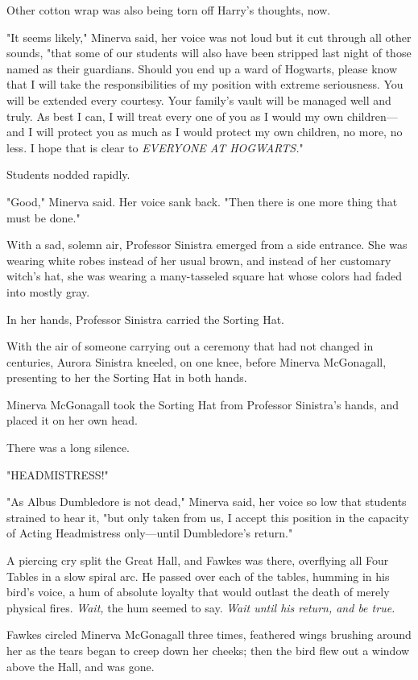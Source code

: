 Other cotton wrap was also being torn off Harry's thoughts, now.

"It seems likely," Minerva said, her voice was not loud but it cut through all
other sounds, "that some of our students will also have been stripped last
night of those named as their guardians. Should you end up a ward of Hogwarts,
please know that I will take the responsibilities of my position with extreme
seriousness. You will be extended every courtesy. Your family's vault will be
managed well and truly. As best I can, I will treat every one of you as I would
my own children---and I will protect you as much as I would protect my own
children, no more, no less. I hope that is clear to \emph{EVERYONE AT
HOGWARTS.}"

Students nodded rapidly.

"Good," Minerva said. Her voice sank back. "Then there is one more thing that
must be done."

With a sad, solemn air, Professor Sinistra emerged from a side entrance. She
was wearing white robes instead of her usual brown, and instead of her
customary witch's hat, she was wearing a many-tasseled square hat whose colors
had faded into mostly gray.

In her hands, Professor Sinistra carried the Sorting Hat.

With the air of someone carrying out a ceremony that had not changed in
centuries, Aurora Sinistra kneeled, on one knee, before Minerva McGonagall,
presenting to her the Sorting Hat in both hands.

Minerva McGonagall took the Sorting Hat from Professor Sinistra's hands, and
placed it on her own head.

There was a long silence.

"HEADMISTRESS!"

"As Albus Dumbledore is not dead," Minerva said, her voice so low that students
strained to hear it, "but only taken from us, I accept this position in the
capacity of Acting Headmistress only---until Dumbledore's return."

A piercing cry split the Great Hall, and Fawkes was there, overflying all Four
Tables in a slow spiral arc. He passed over each of the tables, humming in his
bird's voice, a hum of absolute loyalty that would outlast the death of merely
physical fires. \emph{Wait,} the hum seemed to say. \emph{Wait until his
return, and be true.}

Fawkes circled Minerva McGonagall three times, feathered wings brushing around
her as the tears began to creep down her cheeks; then the bird flew out a
window above the Hall, and was gone.
